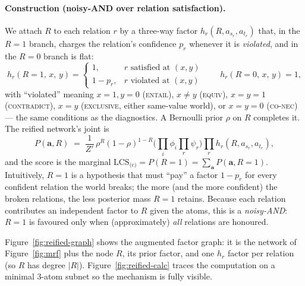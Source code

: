 \documentclass[11pt]{article}
\begin{document}
\paragraph{Construction (noisy-AND over relation satisfaction).} We attach $R$ to each
relation $r$ by a three-way factor $h_r(R,a_{s_r},a_{t_r})$ that, in the $R{=}1$ branch,
charges the relation's confidence $p_r$ whenever it is \emph{violated}, and in the $R{=}0$
branch is flat:
\begin{equation}
  h_r(R{=}1,\,x,\,y)=
  \begin{cases}
    1, & \text{$r$ satisfied at }(x,y)\\[2pt]
    1-p_r, & \text{$r$ violated at }(x,y)
  \end{cases}
  \qquad
  h_r(R{=}0,\,x,\,y)=1,
  \label{eq:reified}
\end{equation}
with ``violated'' meaning $x{=}1,y{=}0$ (\textsc{entail}), $x\neq y$ (\textsc{equiv}),
$x{=}y{=}1$ (\textsc{contradict}), $x{=}y$ (\textsc{exclusive}, either same-value world), or
$x{=}y{=}0$ (\textsc{co-nec}) --- the same conditions as the diagnostics. A Bernoulli
prior $\rho$ on $R$ completes it. The reified network's joint is
\begin{equation}
  P(\mathbf a,R)\;=\;\frac1{Z'}\,\rho^{R}(1-\rho)^{1-R}
  \Big(\prod_i\phi_i\!\prod_r\psi_r\Big)\prod_r h_r(R,a_{s_r},a_{t_r}),
  \label{eq:reified-joint}
\end{equation}
and the score is the marginal
\(
  \mathrm{LCS}_{\text{(c)}}=P(R{=}1)=\sum_{\mathbf a}P(\mathbf a,R{=}1).
\)
Intuitively, $R{=}1$ is a hypothesis that must ``pay'' a factor $1-p_r$ for every confident
relation the world breaks; the more (and the more confident) the broken relations, the less
posterior mass $R{=}1$ retains. Because each relation contributes an independent factor to
$R$ given the atoms, this is a \emph{noisy-AND}: $R{=}1$ is favoured only when
(approximately) \emph{all} relations are honoured.

Figure~\ref{fig:reified-graph} shows the augmented factor graph: it is the network of
Figure~\ref{fig:mrf} plus the node $R$, its prior factor, and one $h_r$ factor per relation
(so $R$ has degree $|R|$). Figure~\ref{fig:reified-calc} traces the computation on a minimal
3-atom subnet so the mechanism is fully visible.
\end{document}
